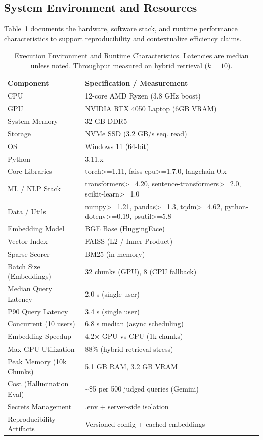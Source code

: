 \documentclass[11pt]{article}
\begin{document}
\subsection{System Environment and Resources}
Table~\ref{tab:environment} documents the hardware, software stack, and runtime performance characteristics to support reproducibility and contextualize efficiency claims.

\begin{table}[!t]
\centering
\caption{Execution Environment and Runtime Characteristics. Latencies are median unless noted. Throughput measured on hybrid retrieval ($k=10$).}
\label{tab:environment}
\small
\setlength{\tabcolsep}{8pt}
\begin{tabularx}{\textwidth}{@{}l X@{}}
\toprule
Component & Specification / Measurement \\
\midrule
CPU & 12-core AMD Ryzen (3.8 GHz boost) \\
GPU & NVIDIA RTX 4050 Laptop (6GB VRAM) \\
System Memory & 32 GB DDR5 \\
Storage & NVMe SSD (3.2 GB/s seq. read) \\
OS & Windows 11 (64-bit) \\
Python & 3.11.x \\
Core Libraries & torch>=1.11, faiss-cpu>=1.7.0, langchain 0.x \\
ML / NLP Stack & transformers>=4.20, sentence-transformers>=2.0, scikit-learn>=1.0 \\
Data / Utils & numpy>=1.21, pandas>=1.3, tqdm>=4.62, python-dotenv>=0.19, psutil>=5.8 \\
Embedding Model & BGE Base (HuggingFace) \\
Vector Index & FAISS (L2 / Inner Product) \\
Sparse Scorer & BM25 (in-memory) \\
Batch Size (Embeddings) & 32 chunks (GPU), 8 (CPU fallback) \\
Median Query Latency & 2.0 s (single user) \\
P90 Query Latency & 3.4 s (single user) \\
Concurrent (10 users) & 6.8 s median (async scheduling) \\
Embedding Speedup & 4.2× GPU vs CPU (1k chunks) \\
Max GPU Utilization & 88\% (hybrid retrieval stress) \\
Peak Memory (10k Chunks) & 5.1 GB RAM, 3.2 GB VRAM \\
Cost (Hallucination Eval) & \textasciitilde\$5 per 500 judged queries (Gemini) \\
Secrets Management & .env + server-side isolation \\
Reproducibility Artifacts & Versioned config + cached embeddings \\
\bottomrule
\end{tabularx}
\end{table}
\end{document}

